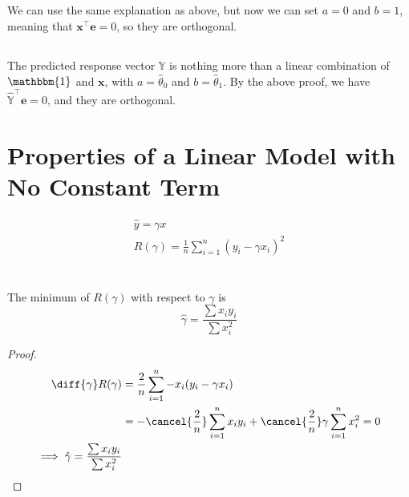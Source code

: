 \documentclass{article}
\newcommand{\Y}{\mathbb{Y}}
\newcommand{\One}{\mathbbm{1}}
\begin{document}
\subsection{}

We can use the same explanation as above, but now we can set \(a = 0\) and \(b = 1\), meaning that \(\bm{x}^\top \bm{e} = 0\), so they are orthogonal.

\subsection{}

The predicted response vector \(\Y\) is nothing more than a linear combination of \(\One\) and \(\bm{x}\), with \(a = \hat{\theta}_0\) and \(b = \hat{\theta}_1\).
By the above proof, we have \(\hat{\Y}^\top \bm{e} = 0\), and they are orthogonal.

\section*{Properties of a Linear Model with No Constant Term}

\begin{gather}
    \hat{y} = \gamma x \\
    R(\gamma) = \frac{1}{n} \sum_{i = 1}^n (y_i - \gamma x_i)^2
\end{gather}

\section{}

\begin{theorem}
    The minimum of \(R(\gamma)\) with respect to \(\gamma\) is
    \begin{equation}
        \hat{\gamma} = \frac{\sum x_i y_i}{\sum x_i^2}
    \end{equation}
\end{theorem}
\begin{proof}
    \begin{align}
        \diff{\gamma} R(\gamma) &= \frac{2}{n} \sum_{i = 1}^n -x_i (y_i - \gamma x_i) \\
        &= -\cancel{\frac{2}{n}} \sum_{i = 1}^n x_i y_i + \cancel{\frac{2}{n}} \gamma \sum_{i = 1}^n x_i^2 = 0 \\
        \implies \hat{\gamma} = \frac{\sum x_i y_i}{\sum x_i^2}
    \end{align}
\end{proof}
\end{document}
